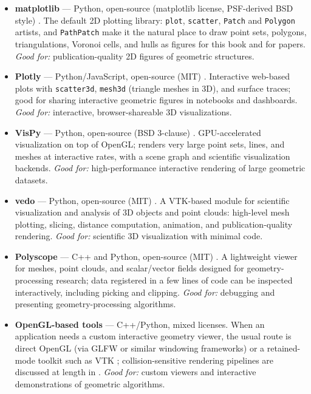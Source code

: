 \begin{itemize}
  \item \textbf{matplotlib} --- Python, open-source (matplotlib license,
    PSF-derived BSD style) \cite{matplotlib}. The default 2D plotting
    library: \texttt{plot}, \texttt{scatter}, \texttt{Patch} and
    \texttt{Polygon} artists, and \texttt{PathPatch} make it the natural
    place to draw point sets, polygons, triangulations, Voronoi cells,
    and hulls as figures for this book and for papers.
    \emph{Good for:} publication-quality 2D figures of geometric
    structures.
  \item \textbf{Plotly} --- Python/JavaScript, open-source (MIT)
    \cite{plotly}. Interactive web-based plots with \texttt{scatter3d},
    \texttt{mesh3d} (triangle meshes in 3D), and surface traces;
    good for sharing interactive geometric figures in notebooks and
    dashboards. \emph{Good for:} interactive, browser-shareable 3D
    visualizations.
  \item \textbf{VisPy} --- Python, open-source (BSD 3-clause)
    \cite{vispy}. GPU-accelerated visualization on top of OpenGL; renders
    very large point sets, lines, and meshes at interactive rates, with
    a scene graph and scientific visualization backends.
    \emph{Good for:} high-performance interactive rendering of large
    geometric datasets.
  \item \textbf{vedo} --- Python, open-source (MIT) \cite{vedo}. A
    VTK-based module for scientific visualization and analysis of 3D
    objects and point clouds: high-level mesh plotting, slicing, distance
    computation, animation, and publication-quality rendering.
    \emph{Good for:} scientific 3D visualization with minimal code.
  \item \textbf{Polyscope} --- C++ and Python, open-source (MIT)
    \cite{polyscope}. A lightweight viewer for meshes, point clouds, and
    scalar/vector fields designed for geometry-processing research;
    data registered in a few lines of code can be inspected
    interactively, including picking and clipping.
    \emph{Good for:} debugging and presenting geometry-processing
    algorithms.
  \item \textbf{OpenGL-based tools} --- C++/Python, mixed licenses.
    When an application needs a custom interactive geometry viewer, the
    usual route is direct OpenGL (via GLFW or similar windowing
    frameworks) or a retained-mode toolkit such as VTK \cite{vtk};
    collision-sensitive rendering pipelines are discussed at length in
    \cite{vandenbergen2004}. \emph{Good for:} custom viewers and
    interactive demonstrations of geometric algorithms.
\end{itemize}

